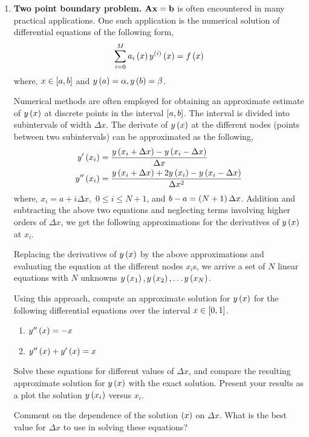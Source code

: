 \begin{enumerate}[resume]
    \item \textbf{Two point boundary problem.} $\mathbf{A}\mathbf{x} = \mathbf{b}$ is often encountered in many practical applications. One such application is the numerical solution of differential equations of the following form,
    \[ \sum_{i=0}^M a_{i}\left( x\right) y^{\left( i\right)}\left( x\right) = f\left( x\right) \]
    where, $x \in \left[ a, b\right]$ and $y\left( a\right) = \alpha, y\left( b\right) = \beta$. 

    Numerical methods are often employed for obtaining an approximate estimate of $y\left( x\right)$ at discrete points in the interval $\left[ a,b\right]$. The interval is divided into subintervals of width $\Delta x$. The derivate of $y\left( x\right)$ at the different nodes (points between two subintervals) can be approximated as the following,
    \begin{align}
    y'\left( x_i\right) &= \frac{y\left( x_i + \Delta x\right) - y\left( x_i - \Delta x\right)}{\Delta x}\nonumber\\
    y''\left( x_i\right) &= \frac{y\left( x_i + \Delta x\right) + 2y\left( x_i\right) - y\left( x_i - \Delta x\right)}{\Delta x^2} \nonumber
    \end{align}
    where, $x_i = a + i\Delta x, \,\, 0 \leq i \leq N+1$, and $b - a = \left( N+1\right) \Delta x$. Addition and subtracting the above two equations and neglecting terms involving higher orders of $\Delta x$, we get the following approximations for the derivatives of $y\left( x\right)$ at $x_i$.

    Replacing the derivatives of $y\left( x\right)$ by the above approximations and evaluating the equation at the different nodes $x_i$s, we arrive a set of $N$ linear equations with $N$ unknowns $y\left( x_1\right), y\left( x_2\right), \ldots y\left( x_N\right)$. 

    Using this approach, compute an approximate solution for $y\left( x\right)$ for the following differential equations over the interval $x \in \left[ 0, 1\right]$. 
    \begin{enumerate}
         \item $y''\left( x\right) = -x$
         \item $y''\left( x\right) + y'\left( x\right) = x$
    \end{enumerate}
    Solve these equations for different values of $\Delta x$, and compare the resulting approximate solution for $y\left( x\right)$ with the exact solution.   Present your results as a plot the solution $y\left( x_i\right)$ versus $x_i$.

    Comment on the dependence of the solution $\left( x\right)$ on $\Delta x$. What is the best value for $\Delta x$ to use in solving these equations?


\end{enumerate}
